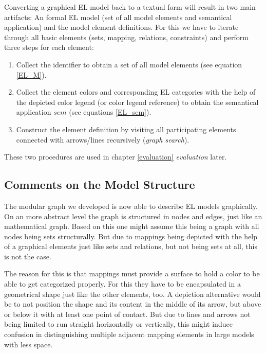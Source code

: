 \documentclass[twoside, openright, 12pt]{book}
\begin{document}
\noindent
Converting a graphical EL model back to a textual form will result in two main artifacts: An formal EL model (set of all model elements and semantical application) and the model element definitions.
For this we have to iterate through all basic elements (sets, mapping, relations, constraints) and perform three steps for each element:

\begin{enumerate}
\item Collect the identifier to obtain a set of all model elements (see equation \ref{EL_M}).

\item Collect the element colors and corresponding EL categories with the help of the depicted color legend (or color legend reference) to obtain the semantical application $\mathit{sem}$ (see equations \ref{EL_sem}).

\item Construct the element definition by visiting all participating elements connected with arrows/lines recursively (\textit{graph search}).
\end{enumerate}

\noindent
These two procedures are used in chapter \ref{evaluation} \textit{evaluation} later.



\subsection{Comments on the Model Structure}
\label{comments_on_model_structure}
The modular graph we developed is now able to describe EL models graphically.
On an more abstract level the graph is structured in nodes and edges, just like an mathematical graph.
Based on this one might assume this being a graph with all nodes being sets structurally.
But due to mappings being depicted with the help of a graphical elements just like sets and relations, but not being sets at all, this is not the case.

The reason for this is that mappings must provide a surface to hold a color to be able to get categorized properly.
For this they have to be encapsulated in a geometrical shape just like the other elements, too.
A depiction alternative would be to not position the shape and its content in the middle of its arrow, but above or below it with at least one point of contact.
But due to lines and arrows not being limited to run straight horizontally or vertically, this might induce confusion in distinguishing multiple adjacent mapping elements in large models with less space.
\end{document}
